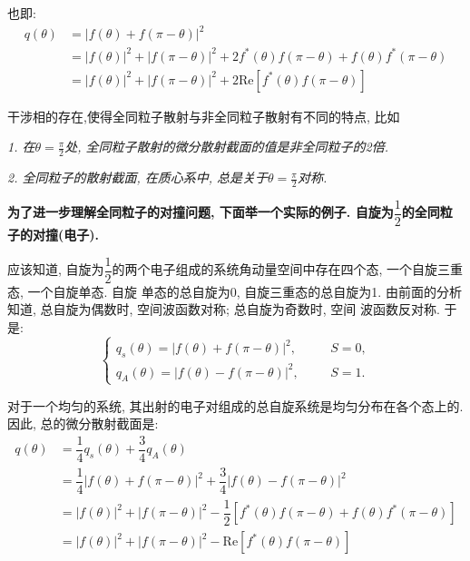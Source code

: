 \documentclass[a4paper, 11pt]{article}
\begin{document}
\begin{spacing}{1.2}
          也即:
          \begin{equation}
            \begin{aligned}
              q(\theta) &= |f(\theta) + f(\pi-\theta)|^2 \\
                        &= |f(\theta)|^2 + |f(\pi-\theta)|^2 + 2f^*(\theta)f(\pi-\theta) + f(\theta)f^*(\pi-\theta)\\
                        &= |f(\theta)|^2 + |f(\pi-\theta)|^2 + 2\mathrm{Re}[f^*(\theta)f(\pi-\theta)]
            \end{aligned}
          \end{equation}

          干涉相的存在,使得全同粒子散射与非全同粒子散射有不同的特点, 比如

          \emph{1. 在$\theta=\frac{\pi}{2}$处, 全同粒子散射的微分散射截面的值是非全同粒子的2倍.}

          \emph{2. 全同粒子的散射截面, 在质心系中, 总是关于$\theta = \frac{\pi}{2}$对称.}

          \textbf{为了进一步理解全同粒子的对撞问题, 下面举一个实际的例子. 自旋为$\dfrac{1}{2}$的全同粒子的对撞(电子).}

          应该知道, 自旋为$\dfrac{1}{2}$的两个电子组成的系统角动量空间中存在四个态, 一个自旋三重态, 一个自旋单态. 自旋
          单态的总自旋为0, 自旋三重态的总自旋为1. 由前面的分析知道, 总自旋为偶数时, 空间波函数对称; 总自旋为奇数时, 空间
          波函数反对称. 于是:
          \begin{equation}
            \left\{
            \begin{aligned}
              q_s(\theta) = |f(\theta)+f(\pi-\theta)|^2, \;\;\;\;\;\; &  S=0,\\
              q_A(\theta) = |f(\theta)-f(\pi-\theta)|^2, \;\;\;\;\;\; &  S=1.
            \end{aligned}\right.
          \end{equation}

          对于一个均匀的系统, 其出射的电子对组成的总自旋系统是均匀分布在各个态上的. 因此, 总的微分散射截面是:
          \begin{equation}
            \begin{aligned}
              q(\theta) &= \dfrac{1}{4}q_s(\theta)+ \dfrac{3}{4}q_A(\theta)\\
                        &= \dfrac{1}{4}|f(\theta)+f(\pi-\theta)|^2 + \dfrac{3}{4}|f(\theta)-f(\pi-\theta)|^2\\
                        &= |f(\theta)|^2 + |f(\pi-\theta)|^2 - \dfrac{1}{2}[f^*(\theta)f(\pi-\theta) + f(\theta)f^*(\pi-\theta)]\\
                        &= |f(\theta)|^2 + |f(\pi-\theta)|^2 - \mathrm{Re}[f^*(\theta)f(\pi-\theta)]
            \end{aligned}
          \end{equation}


\end{spacing}
\end{document}
